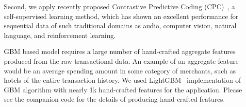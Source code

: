 \documentclass{article}
\begin{document}
Second, we apply recently proposed Contrastive Predictive Coding (CPC)~\cite{Oord2018RepresentationLW}, a self-supervised learning method, which has shown an excellent performance for sequential data of such traditional domains as audio, computer vision, natural language, and reinforcement learning. %

GBM based model requires a large number of hand-crafted aggregate features produced from the raw transactional data. An example of an aggregate feature would be an average spending amount in some category of merchants, such as hotels of the entire transaction history.
We used LightGBM~\cite{Ke2017LightGBMAH} implementation of GBM algorithm with nearly 1k hand-crafted features for the application. Please see the companion code for the details of producing hand-crafted features.

\end{document}
